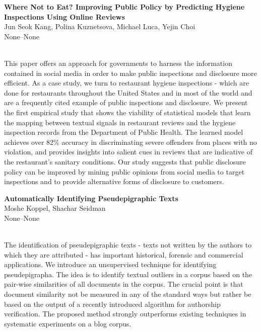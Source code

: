 \documentclass[twoside,makeidx]{book}
\renewcommand{\normalsize}{\fontsize{8}{9}\selectfont}
\renewcommand{\small}{\fontsize{7}{8}\selectfont}
\begin{document}
\par\vspace{2em}\noindent%
\begin{minipage}{\linewidth}%
\begin{center}
\textbf{\normalsize Where Not to Eat? Improving Public Policy by Predicting Hygiene Inspections Using Online Reviews}\\
\normalsize  Jun Seok Kang,  Polina Kuznetsova,  Michael Luca,  Yejin Choi\\
{\small None--None}\\
\end{center}
\end{minipage}\\[0.5em]
\nopagebreak%
\noindent%
{\small This paper offers an approach for governments to harness the information contained in social media in order to make public inspections and disclosure more efficient. As a case study, we turn to restaurant hygiene inspections - which are done for restaurants throughout the United States and in most of the world and are a frequently cited example of public inspections and disclosure. We present the first empirical study that shows the viability of statistical models that learn the mapping between textual signals in restaurant reviews and the hygiene inspection records from the Department of Public Health. The learned model achieves over 82\% accuracy in discriminating severe offenders from places with no violation, and provides insights into salient cues in reviews that are indicative of the restaurant's sanitary conditions. Our study suggests that public disclosure policy can be improved by mining public opinions from social media to target inspections and to provide alternative forms of disclosure to customers.}
\par\vspace{2em}\noindent%
\begin{minipage}{\linewidth}%
\begin{center}
\textbf{\normalsize Automatically Identifying Pseudepigraphic Texts}\\
\normalsize  Moshe Koppel,  Shachar Seidman\\
{\small None--None}\\
\end{center}
\end{minipage}\\[0.5em]
\nopagebreak%
\noindent%
{\small The identification of pseudepigraphic texts - texts not written by the authors to which they are attributed - has important historical, forensic and commercial applications. We introduce an unsupervised technique for identifying pseudepigrapha. The idea is to identify textual outliers in a corpus based on the pair-wise similarities of all documents in the corpus. The crucial point is that document similarity not be measured in any of the standard ways but rather be based on the output of a recently introduced algorithm for authorship verification. The proposed method strongly outperforms existing techniques in systematic experiments on a blog corpus.}
\clearpage
\end{document}
